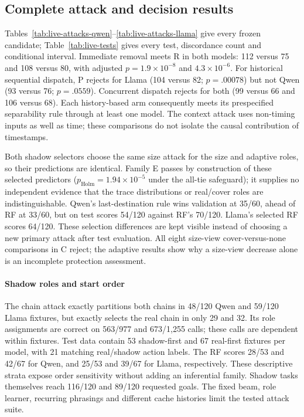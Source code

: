 \subsection{Complete attack and decision results}
Tables~\ref{tab:live-attacks-qwen}--\ref{tab:live-attacks-llama} give every frozen candidate; Table~\ref{tab:live-tests} gives every test, discordance count and conditional interval. Immediate removal meets R in both models: 112 versus 75 and 108 versus 80, with adjusted $p=1.9\times10^{-8}$ and $4.3\times10^{-6}$. For historical sequential dispatch, P rejects for Llama (104 versus 82; $p=.00078$) but not Qwen (93 versus 76; $p=.0559$). Concurrent dispatch rejects for both (99 versus 66 and 106 versus 68). Each history-based arm consequently meets its prespecified separability rule through at least one model. The context attack uses non-timing inputs as well as time; these comparisons do not isolate the causal contribution of timestamps.

Both shadow selectors choose the same size attack for the size and adaptive roles, so their predictions are identical. Family E passes by construction of these selected predictors ($p_{\mathrm{Holm}}=1.94\times10^{-5}$ under the all-tie safeguard); it supplies no independent evidence that the trace distributions or real/cover roles are indistinguishable. Qwen's last-destination rule wins validation at 35/60, ahead of RF at 33/60, but on test scores 54/120 against RF's 70/120. Llama's selected RF scores 64/120. These selection differences are kept visible instead of choosing a new primary attack after test evaluation. All eight size-view cover-versus-none comparisons in C reject; the adaptive results show why a size-view decrease alone is an incomplete protection assessment.





\paragraph{Shadow roles and start order}
The chain attack exactly partitions both chains in 48/120 Qwen and 59/120 Llama fixtures, but exactly selects the real chain in only 29 and 32. Its role assignments are correct on 563/977 and 673/1,255 calls; these calls are dependent within fixtures. Test data contain 53 shadow-first and 67 real-first fixtures per model, with 21 matching real/shadow action labels. The RF scores 28/53 and 42/67 for Qwen, and 25/53 and 39/67 for Llama, respectively. These descriptive strata expose order sensitivity without adding an inferential family. Shadow tasks themselves reach 116/120 and 89/120 requested goals. The fixed beam, role learner, recurring phrasings and different cache histories limit the tested attack suite.

